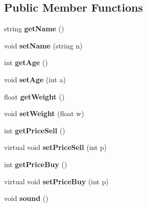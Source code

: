 \subsection*{Public Member Functions}
\begin{DoxyCompactItemize}
\item 
\mbox{\label{class_animal_acd010252e10da84a05efd43d9bf69279}} 
string {\bfseries get\+Name} ()
\item 
\mbox{\label{class_animal_aa26d5b8f6912f03da2cc64ff0b888972}} 
void {\bfseries set\+Name} (string n)
\item 
\mbox{\label{class_animal_a4b3acac24e7995363c4f130887c3b3ab}} 
int {\bfseries get\+Age} ()
\item 
\mbox{\label{class_animal_a91a574efed96581f15ce99c62dba3778}} 
void {\bfseries set\+Age} (int a)
\item 
\mbox{\label{class_animal_a722be3bcb2f66289160b6932111caf32}} 
float {\bfseries get\+Weight} ()
\item 
\mbox{\label{class_animal_a79b8aaf14511a9624d35fb9e83959270}} 
void {\bfseries set\+Weight} (float w)
\item 
\mbox{\label{class_animal_ad5cee2c9d8bdfc27e3eea866f7ed6eea}} 
int {\bfseries get\+Price\+Sell} ()
\item 
\mbox{\label{class_animal_aee99154e40d8d538308f803a24bd8314}} 
virtual void {\bfseries set\+Price\+Sell} (int p)
\item 
\mbox{\label{class_animal_a0d329a7e10c3ab3af2f4e9048326c1e2}} 
int {\bfseries get\+Price\+Buy} ()
\item 
\mbox{\label{class_animal_a6ad26fc54e55d2a577bdb0673f9c6c7e}} 
virtual void {\bfseries set\+Price\+Buy} (int p)
\item 
\mbox{\label{class_animal_a39c25838a7b4dd87e67838cc6e78fae6}} 
void {\bfseries sound} ()
\item 
\mbox{\label{class_animal_ad018a3798fe7ddf30da60d8f2557701b}} 

\end{DoxyCompactItemize}
